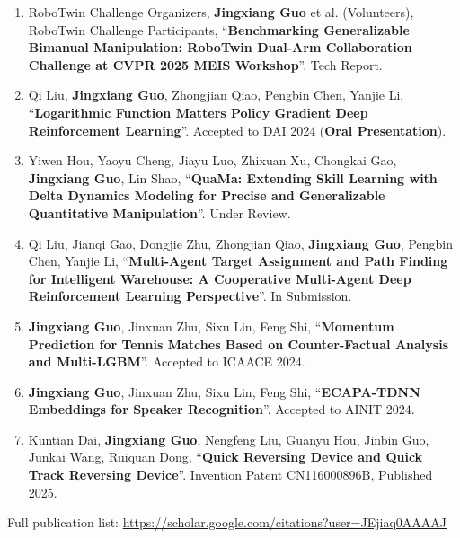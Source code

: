 \documentclass[letterpaper,11pt]{article}
\newif\iffullcv
\begin{document}
\begin{enumerate}
  \item RoboTwin Challenge Organizers, \textbf{Jingxiang Guo} et al. (Volunteers), RoboTwin Challenge Participants, ``\textbf{Benchmarking Generalizable Bimanual Manipulation: RoboTwin Dual-Arm Collaboration Challenge at CVPR 2025 MEIS Workshop}''. Tech Report.

  \item Qi Liu, \textbf{Jingxiang Guo}, Zhongjian Qiao, Pengbin Chen, Yanjie Li, ``\textbf{Logarithmic Function Matters Policy Gradient Deep Reinforcement Learning}''. Accepted to DAI 2024 (\textbf{Oral Presentation}).

  \item Yiwen Hou, Yaoyu Cheng, Jiayu Luo, Zhixuan Xu, Chongkai Gao, \textbf{Jingxiang Guo}, Lin Shao, ``\textbf{QuaMa: Extending Skill Learning with Delta Dynamics Modeling for Precise and Generalizable Quantitative Manipulation}''. Under Review.

  \item Qi Liu, Jianqi Gao, Dongjie Zhu, Zhongjian Qiao, \textbf{Jingxiang Guo}, Pengbin Chen, Yanjie Li, ``\textbf{Multi-Agent Target Assignment and Path Finding for Intelligent Warehouse: A Cooperative Multi-Agent Deep Reinforcement Learning Perspective}''. In Submission.

  \item \textbf{Jingxiang Guo}, Jinxuan Zhu, Sixu Lin, Feng Shi, ``\textbf{Momentum Prediction for Tennis Matches Based on Counter-Factual Analysis and Multi-LGBM}''. Accepted to ICAACE 2024.

  \item \textbf{Jingxiang Guo}, Jinxuan Zhu, Sixu Lin, Feng Shi, ``\textbf{ECAPA-TDNN Embeddings for Speaker Recognition}''. Accepted to AINIT 2024.

  \item Kuntian Dai, \textbf{Jingxiang Guo}, Nengfeng Liu, Guanyu Hou, Jinbin Guo, Junkai Wang, Ruiquan Dong, ``\textbf{Quick Reversing Device and Quick Track Reversing Device}''. Invention Patent CN116000896B, Published 2025.

\fi

\end{enumerate}
\iffullcv\else
\small{Full publication list: \url{https://scholar.google.com/citations?user=JEjiaq0AAAAJ}}
\fi
\end{document}
